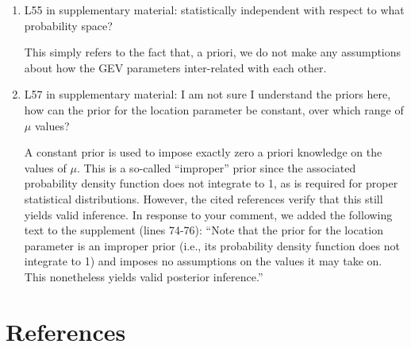 \documentclass[11pt]{article}
\newcommand{\newTxt}{\textcolor{cadmiumgreen}}
\begin{document}
\begin{enumerate}
    \item L55 in supplementary material: statistically independent with respect to what probability space?

    \newTxt{This simply refers to the fact that, a priori, we do not make any assumptions about how the GEV parameters inter-related with each other.}
    
    \item L57 in supplementary material: I am not sure I understand the priors here, how can the prior for the location parameter be constant, over which range of $\mu$ values?

    \newTxt{A constant prior is used to impose exactly zero a priori knowledge on the values of $\mu$. This is a so-called ``improper'' prior since the associated probability density function does not integrate to 1, as is required for proper statistical distributions. However, the cited references verify that this still yields valid inference. In response to your comment, we added the following text to the supplement (lines 74-76): ``Note that the prior for the location parameter is an improper prior (i.e., its probability density function does not integrate to 1) and imposes no assumptions on the values it may take on. This nonetheless yields valid posterior inference.'' }
    
\end{enumerate}


\section*{References}
 
% 
\end{document}
